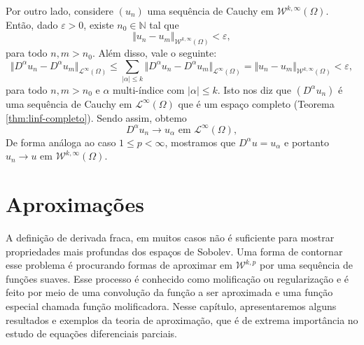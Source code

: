 \documentclass[a4paper, 11pt]{book}
\theoremstyle{definition}
\newcommand{\bN}{\mathbb{N}}
\newcommand{\cL}{\mathcal{L}}
\newcommand{\cW}{\mathcal{W}}
\begin{document}
\begin{prf}
    Por outro lado, considere $(u_n)$ uma sequência de Cauchy em $\cW^{k,\infty}(\Omega)$. Então, dado $\varepsilon > 0$, existe $n_0 \in \bN$ tal que
    \[
        \Vert u_n - u_m \Vert_{\cW^{k,\infty}(\Omega)} < \varepsilon,
    \]
    para todo $n,m > n_0$. Além disso, vale o seguinte:
    \[
        \Vert D^\alpha u_n - D^\alpha u_m \Vert_{\cL^\infty(\Omega)} \leqslant \sum_{|\alpha| \leqslant k} \Vert D^\alpha u_n - D^\alpha u_m \Vert_{\cL^\infty(\Omega)} = \Vert u_n - u_m \Vert_{\cW^{k,\infty}(\Omega)} < \varepsilon,
    \]
    para todo $n,m > n_0$ e $\alpha$ multi-índice com $|\alpha| \leqslant k$. Isto nos diz que $(D^\alpha u_n)$ é uma sequência de Cauchy em $\cL^\infty(\Omega)$ que é um espaço completo (Teorema \ref{thm:linf-completo}). Sendo assim, obtemo
    \[
        D^{\alpha} u_n \to u_\alpha \text{ em } \cL^\infty(\Omega),
    \]
    De forma análoga ao caso $1 \leqslant p < \infty$, mostramos que $D^\alpha u = u_\alpha$ e portanto $u_n \to u$ em $\cW^{k,\infty}(\Omega)$.
\end{prf}

\section{Aproximações} \label{sec:aproximacoes}


A definição de derivada fraca, em muitos casos não é suficiente para mostrar propriedades mais profundas dos espaços de Sobolev.
Uma forma de contornar esse problema é procurando formas de aproximar em $\cW^{k,p}$ por uma sequência de funções suaves.
Esse processo é conhecido como molificação ou regularização e é feito por meio de uma convolução da função a ser aproximada e uma função especial chamada função molificadora. 
Nesse capítulo, apresentaremos alguns resultados e exemplos da teoria de aproximação, que é de extrema importância no estudo de equações diferenciais parciais.
\end{document}
